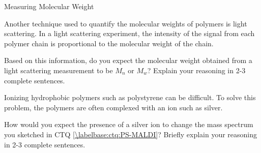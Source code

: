 \begin{activity}{Measuring Molecular Weight}
\begin{ctqs}
	
	
\end{ctqs}


\begin{exercises}

	
	\exercise Another technique used to quantify the molecular weights of polymers is light scattering.  In a light scattering experiment, the intensity of the signal from each polymer chain is proportional to the molecular weight of the chain.
	
		Based on this information, do you expect the molecular weight obtained from a light scattering measurement to be $M_n$ or $M_w$?  Explain your reasoning in 2-3 complete sentences.
		
	
	
	\exercise Ionizing hydrophobic polymers such as polystyrene can be difficult.  To solve this problem, the polymers are often complexed with an ion such as silver.
	
		How would you expect the presence of a silver ion to change the mass spectrum you sketched in CTQ \ref{\labelbase:ctq:PS-MALDI}?  Briefly explain your reasoning in 2-3 complete sentences.
		
	
\end{exercises}


	
\end{activity}